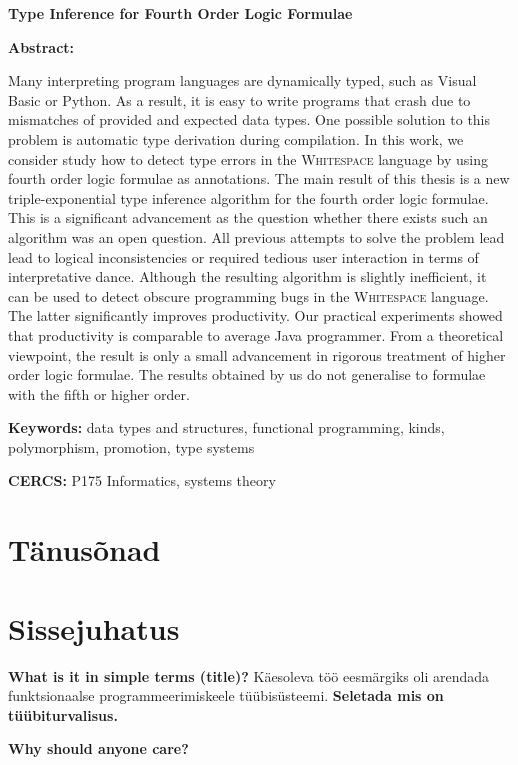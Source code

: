 \documentclass[12pt]{article}
\newcommand\peatykk[1]{
  \clearpage
  \section{#1}}
\newcommand\peatykktarn[1]{
  \clearpage
  \section*{#1}
  \addcontentsline{toc}{section}{#1}}
\newcommand\markus[1]{\textcolor{roheline}{\textbf{#1}}}
\begin{document}
{
\noindent
\textbf{\large Type Inference for Fourth Order Logic Formulae}

\vspace*{3ex}

\noindent
\textbf{Abstract:}

\noindent
Many interpreting program languages are dynamically typed, such as Visual Basic or Python. As a result, it is easy to write programs that crash due to mismatches of provided and expected data types.  One possible solution to this problem is automatic type derivation during compilation. In this work, we consider study how to detect type errors in the \textsc{Whitespace} language by using fourth order logic formulae as annotations. The main result of this thesis is a new triple-exponential type inference algorithm for the fourth order logic formulae. This is a significant advancement as the question whether there exists such an algorithm was an open question. 
All previous attempts to solve the problem lead lead to logical inconsistencies or required tedious user interaction in terms of interpretative dance. Although the resulting algorithm is slightly inefficient, it can be used to detect obscure programming bugs in the \textsc{Whitespace} language. The latter significantly improves productivity. Our practical experiments showed that productivity is comparable to average Java programmer.   
From a theoretical viewpoint, the result is only a small advancement in rigorous treatment of higher order logic formulae. The results obtained by us do not generalise to formulae with the fifth or higher order. 

\vspace*{1ex}

\noindent
\textbf{Keywords:} data types and structures, functional programming, kinds, polymorphism, promotion, type systems

\vspace*{1ex}

\noindent
\textbf{CERCS:} P175 Informatics, systems theory

\vspace*{1ex}
}
\newpage
  \tableofcontents
  \peatykktarn{Tänusõnad}
    
  \peatykk{Sissejuhatus}
    \markus{What is it in simple terms (title)?} Käesoleva töö eesmärgiks oli arendada funktsionaalse programmeerimiskeele tüübisüsteemi. \markus{Seletada mis on tüübiturvalisus.}

    \markus{Why should anyone care?}
\end{document}
